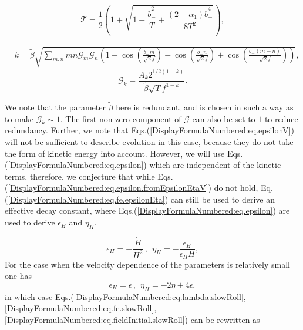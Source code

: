 \documentclass[12pt]{article}
\begin{document}
\begin{equation}
	\mathcal{T}=\frac{1}{2} \left(1+\sqrt{1-\frac{{\dot{b}}_-^2}{T}+\frac{\left(2-\alpha_1\right){\dot{b}}_-^4}{8T^2}}\right),
\end{equation}

\begin{equation}
\begin{split}
	& k=\tilde\beta\sqrt{\sum_{m, n}m n \mathcal{G}_m\mathcal{G}_n \left(1-\cos\left(\frac{b_- m}{\sqrt{2}f}\right)-\cos\left(\frac{b_- n}{\sqrt{2}f}\right)+\cos\left(\frac{b_- \left(m-n\right)}{\sqrt{2}f}\right)\right)},
\end{split}
\end{equation}
\begin{equation}
	\mathcal{G}_k=\frac{A_k2^{1/2\left(1-k\right)}}{\tilde\beta\sqrt{T}f^{1-k}}.
\end{equation}


We note that the parameter $\tilde\beta$ here is redundant, and is chosen in such a way as to make $\mathcal{G}_k\sim 1$. The first non-zero component of $\mathcal{G}$ can also be set to $1$ to reduce redundancy.
Further, we note that Eqs.(\ref{DisplayFormulaNumbered:eq.epsilonV}) will not be sufficient to describe evolution in this case, because they do not take the form of kinetic energy into account. However, we will use
 Eqs.(\ref{DisplayFormulaNumbered:eq.epsilon}) which are independent of the kinetic terms, therefore, we conjecture that while Eqs.(\ref{DisplayFormulaNumbered:eq.epsilon.fromEpsilonEtaV}) do not hold, Eq.(\ref{DisplayFormulaNumbered:eq.fe.epsilonEta}) can still be used to derive an effective decay constant, where Eqs.(\ref{DisplayFormulaNumbered:eq.epsilon}) are used to derive $\epsilon_H$ and $\eta_H$.

\begin{equation}\label{DisplayFormulaNumbered:eq.epsilon} 
	\epsilon_H =-\frac{\dot{H}}{H^2}\,,
	~~\eta_H =-\frac{\dot{\epsilon_H}}{\epsilon_H H},
\end{equation}
For the case when the velocity dependence of the parameters is relatively small one has 
\begin{equation}\label{DisplayFormulaNumbered:eq.epsilon.fromEpsilonEtaV} 
	\epsilon_H =\epsilon\,,
	~~\eta_H =-2\eta+4\epsilon,
\end{equation}
in which case Eqs.(\ref{DisplayFormulaNumbered:eq.lambda.slowRoll}, \ref{DisplayFormulaNumbered:eq.fe.slowRoll}, \ref{DisplayFormulaNumbered:eq.fieldInitial.slowRoll}) can be rewritten as
\end{document}
